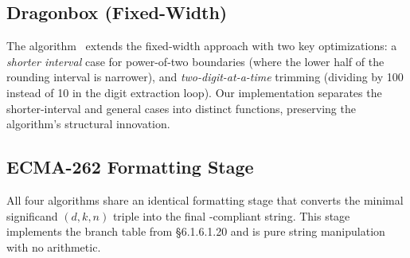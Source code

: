 \subsection{Dragonbox (Fixed-Width)}

The \dragonbox algorithm~\cite{jeon2021dragonbox} extends the
fixed-width approach with two key optimizations: a \emph{shorter
interval} case for power-of-two boundaries (where the lower half of the
rounding interval is narrower), and \emph{two-digit-at-a-time} trimming
(dividing by 100 instead of 10 in the digit extraction loop).  Our
implementation separates the shorter-interval and general cases into
distinct functions, preserving the algorithm's structural innovation.

\subsection{ECMA-262 Formatting Stage}

All four algorithms share an identical formatting stage that converts the
minimal significand $(d, k, n)$ triple into the final \ecma-compliant
string.  This stage implements the branch table from \ecma \S6.1.6.1.20
and is pure string manipulation with no arithmetic.
